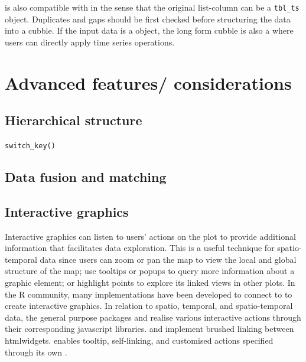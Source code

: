 \documentclass[
]{jss}
\begin{document}
 is also compatible with  in the sense that the
original list-column can be a \texttt{tbl\_ts} object. Duplicates and
gaps should be first checked before structuring the data into a cubble.
If the input data is a  object, the long form cubble is
also a  where users can directly apply time series
operations.

\hypertarget{advanced-features-considerations}{%
\section{Advanced features/
considerations}\label{advanced-features-considerations}}

\hypertarget{hierarchical-structure}{%
\subsection{Hierarchical structure}\label{hierarchical-structure}}

\texttt{switch\_key()}

\hypertarget{data-fusion-and-matching}{%
\subsection{Data fusion and matching}\label{data-fusion-and-matching}}

\hypertarget{interactive-graphics}{%
\subsection{Interactive graphics}\label{interactive-graphics}}

Interactive graphics can listen to users' actions on the plot to provide
additional information that facilitates data exploration. This is a
useful technique for spatio-temporal data since users can zoom or pan
the map to view the local and global structure of the map; use tooltips
or popups to query more information about a graphic element; or
highlight points to explore its linked views in other plots. In the R
community, many implementations have been developed to connect
 to  to create interactive graphics. In
relation to spatio, temporal, and spatio-temporal data, the general
purpose packages  \citep{plotly} and 
\citep{leaflet} realise various interactive actions through their
corresponding javascript libraries.  \citep{crosstalk}
and  \citep{tsibbletalk} implement brushed linking
between htmlwidgets.  \citep{ggiraph} enables tooltip,
self-linking, and customised actions specified through its own
.
\end{document}
